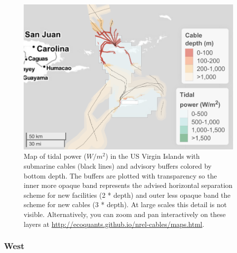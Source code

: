 \documentclass[]{article}
\begin{document}
\begin{figure}
\centering
\includegraphics{report_files/figure-latex/mapTideUSVirginIslands-1.pdf}
\caption{\label{fig:mapTideUSVirginIslands}Map of tidal power (\(W/m^2\)) in
the US Virgin Islands with submarine cables (black lines) and advisory
buffers colored by bottom depth. The buffers are plotted with
transparency so the inner more opaque band represents the advised
horizontal separation scheme for new facilities (2 * depth) and outer
less opaque band the scheme for new cables (3 * depth). At large scales
this detail is not visible. Alternatively, you can zoom and pan
interactively on these layers at
\url{http://ecoquants.github.io/nrel-cables/maps.html}.}
\end{figure}

\hypertarget{west}{%
\subsubsection{West}\label{west}}
\end{document}
